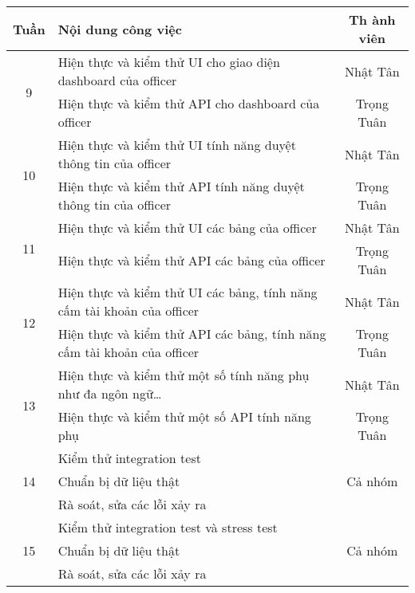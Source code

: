 \documentclass[../main.tex]{subfiles}
\begin{document}
	\begin{table}[ht]
		\centering
		\begin{tabular}{| c | p{10cm} | c |}
			\hline
			\textbf{Tuần} & \centering \textbf{Nội dung công việc} & \textbf{Th
			ành viên} \\
			\hline

			\multirow{2}{*}{9} & Hiện thực và kiểm thử UI cho giao diện dashboard của officer
			& Nhật Tân
			\\
			\cline{2-3}
			& Hiện thực và kiểm thử API cho dashboard của officer
			& Trọng Tuân
			\\
			\hline

			\multirow{2}{*}{10} & Hiện thực và kiểm thử UI tính năng duyệt thông tin của officer
			& Nhật Tân
			\\
			\cline{2-3}
			& Hiện thực và kiểm thử API tính năng duyệt thông tin của officer
			& Trọng Tuân
			\\
			\hline

			\multirow{2}{*}{11} & Hiện thực và kiểm thử UI các bảng của officer
			& Nhật Tân
			\\
			\cline{2-3}
			& Hiện thực và kiểm thử API các bảng của officer
			& Trọng Tuân
			\\
			\hline

			\multirow{2}{*}{12} & Hiện thực và kiểm thử UI các bảng, tính năng cấm tài khoản của officer
			& Nhật Tân
			\\
			\cline{2-3}
			& Hiện thực và kiểm thử API các bảng, tính năng cấm tài khoản của officer
			& Trọng Tuân
			\\
			\hline

			\multirow{2}{*}{13} & Hiện thực và kiểm thử một số tính năng phụ như đa ngôn ngữ\ldots
			& Nhật Tân
			\\
			\cline{2-3}
			& Hiện thực và kiểm thử một số API tính năng phụ
			& Trọng Tuân
			\\
			\hline

			\multirow{3}{*}{14} & Kiểm thử integration test & \multirow{
				3}{*}{Cả nhóm} \\
			\cline{2-2}
			& Chuẩn bị dữ liệu thật
			&
			\\
			\cline{2-2}
			& Rà soát, sửa các lỗi xảy ra
			&
			\\
			\hline

			\multirow{3}{*}{15} & Kiểm thử integration test và stress test & \multirow{
				3}{*}{Cả nhóm} \\
			\cline{2-2}
			& Chuẩn bị dữ liệu thật
			&
			\\
			\cline{2-2}
			& Rà soát, sửa các lỗi xảy ra
			&
			\\
			\hline


\end{tabular}
\end{table}
\end{document}
